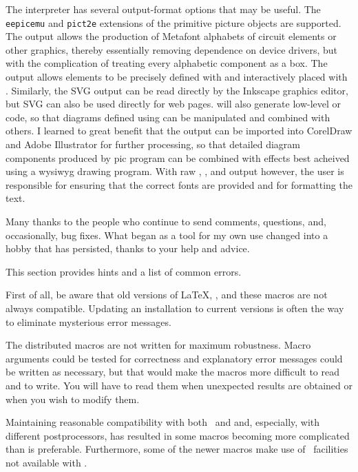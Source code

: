 The \dpic interpreter has several output-format options that may be
useful.  The {\tt eepicemu} and {\tt pict2e} extensions of the
primitive \latex picture objects are supported.  The \mfpic output
allows the production of Metafont alphabets of circuit elements or
other graphics, thereby essentially removing dependence on device
drivers, but with the complication of treating every alphabetic
component as a \tex box.  The \xfig output allows elements to be
precisely defined with \dpic  and interactively placed with \xfig.
Similarly, the SVG output can be read directly by the Inkscape graphics
editor, but SVG can also be used directly for web pages.
\Dpic will also generate low-level \MetaPost or \Postscript code, so
that diagrams defined using \pic can be manipulated and combined with
others.
I learned to great benefit that the \Postscript output can be imported
into CorelDraw and Adobe Illustrator for further processing, so that
detailed diagram components produced by pic program can be combined
with effects best acheived using a wysiwyg drawing program.  With raw
\Postscript, \PDF, and \SVG output however, the user is responsible for
ensuring that the correct fonts are provided and for formatting the text.

Many thanks to the people who continue to send comments, questions,
and, occasionally, bug fixes. What began as a tool for my own use changed
into a hobby that has persisted, thanks to your help and advice.

This section provides hints and a list of common errors.

First of all, be aware that old versions of \LaTeX, \dpic, and these
macros are not always compatible.  Updating an installation to current
versions is often the way to eliminate mysterious error messages.

The distributed macros are not written for maximum robustness.
Macro arguments could be tested for correctness and
explanatory error messages could be written as necessary, but that
would make the macros more difficult to read and to write.  You will
have to read them when unexpected results are obtained or when you wish
to modify them.

Maintaining reasonable compatibility with both \gpic\ and \dpic
and, especially, with different postprocessors, has
resulted in some macros becoming more complicated than is preferable.
Furthermore, some of the newer macros make use of \dpic\ facilities
not available with \gpic.

